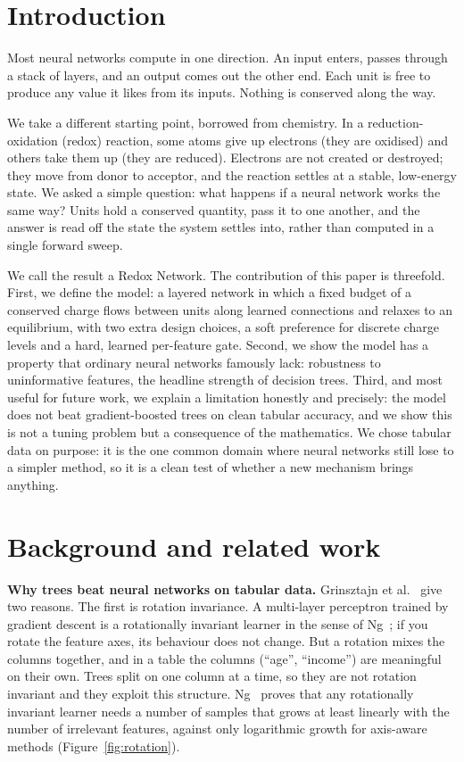 \documentclass[11pt]{article}
\begin{document}
\section{Introduction}

Most neural networks compute in one direction. An input enters, passes through a stack of
layers, and an output comes out the other end. Each unit is free to produce any value it
likes from its inputs. Nothing is conserved along the way.

We take a different starting point, borrowed from chemistry. In a reduction-oxidation (redox)
reaction, some atoms give up electrons (they are oxidised) and others take them up (they are
reduced). Electrons are not created or destroyed; they move from donor to acceptor, and the
reaction settles at a stable, low-energy state. We asked a simple question: what happens if a
neural network works the same way? Units hold a conserved quantity, pass it to one another,
and the answer is read off the state the system settles into, rather than computed in a
single forward sweep.

We call the result a Redox Network. The contribution of this paper is threefold. First, we
define the model: a layered network in which a fixed budget of a conserved charge flows
between units along learned connections and relaxes to an equilibrium, with two extra design
choices, a soft preference for discrete charge levels and a hard, learned per-feature gate.
Second, we show the model has a property that ordinary neural networks famously lack:
robustness to uninformative features, the headline strength of decision trees. Third, and
most useful for future work, we explain a limitation honestly and precisely: the model does
not beat gradient-boosted trees on clean tabular accuracy, and we show this is not a tuning
problem but a consequence of the mathematics. We chose tabular data on purpose: it is the one
common domain where neural networks still lose to a simpler method, so it is a clean test of
whether a new mechanism brings anything.

\section{Background and related work}

\textbf{Why trees beat neural networks on tabular data.} Grinsztajn et al.~\cite{grinsztajn}
give two reasons. The first is rotation invariance. A multi-layer perceptron trained by
gradient descent is a rotationally invariant learner in the sense of Ng~\cite{ng}; if you
rotate the feature axes, its behaviour does not change. But a rotation mixes the columns
together, and in a table the columns (``age'', ``income'') are meaningful on their own. Trees
split on one column at a time, so they are not rotation invariant and they exploit this
structure. Ng~\cite{ng} proves that any rotationally invariant learner needs a number of
samples that grows at least linearly with the number of irrelevant features, against only
logarithmic growth for axis-aware methods (Figure~\ref{fig:rotation}).
\end{document}

